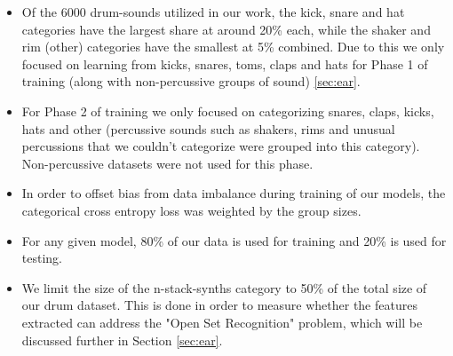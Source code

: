 \documentclass[\main/thesis.tex]{subfiles}
\begin{document}
\begin{itemize}
\item Of the 6000 drum-sounds utilized in our work, the kick, snare and hat categories have the largest share at around 20\% each, while the shaker and rim (other) categories have the smallest at 5\% combined. Due to this we only focused on learning from kicks, snares, toms, claps and hats for Phase 1 of training (along with non-percussive groups of sound) \ref{sec:ear}.

\item For Phase 2 of training we only focused on categorizing snares, claps, kicks, hats and other (percussive sounds such as shakers, rims and unusual percussions that we couldn't categorize were grouped into this category). Non-percussive datasets were not used for this phase. 
\item In order to offset bias from data imbalance during training of our models, the categorical cross entropy loss was weighted by the group sizes. 
\item For any given model, 80\% of our data is used for training and 20\% is used for testing. 

\item We limit the size of the n-stack-synths category to 50\% of the total size of our drum dataset. This is done in order to measure whether the features extracted can address the "Open Set Recognition" problem, which will be discussed further in Section \ref{sec:ear}.
\end{itemize}
\end{document}
